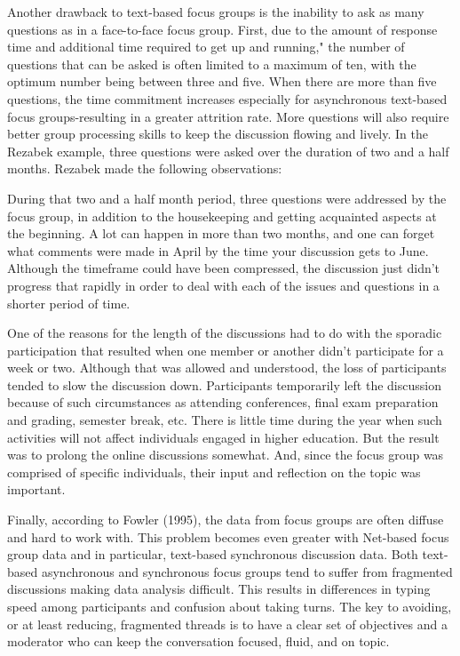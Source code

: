 \documentclass[a4]{article}
\begin{document}
Another drawback to text-based focus groups is the inability to ask as many questions as in a face-to-face focus group. First, due to the amount of response time and additional time required to get up and running," the number of questions that can be asked is often limited to a maximum of ten, with the optimum number being between three and five. When there are more than five questions, the time commitment increases especially for asynchronous text-based focus groups-resulting in a greater attrition rate. More questions will also require better group processing skills to keep the discussion flowing and lively. In the Rezabek example, three questions were asked over the duration of two and a half months. Rezabek made the following observations:


	During that two and a half month period, three questions were addressed by the focus group, in addition to the housekeeping and getting acquainted aspects at the beginning. A lot can happen in more than two months, and one can forget what comments were made in April by the time your discussion gets to June. Although the timeframe could have been compressed, the discussion just didn't progress that rapidly in order to deal with each of the issues and questions in a shorter period of time.
	
	One of the reasons for the length of the discussions had to do with the sporadic participation that resulted when one member or another didn't participate for a week or two. Although that was allowed and understood, the loss of participants tended to slow the discussion down. Participants temporarily left the discussion because of such circumstances as attending conferences, final exam preparation and grading, semester break, etc. There is little time during the year when such activities will not affect individuals engaged in higher education. But the result was to prolong the online discussions somewhat. And, since the focus group was comprised of specific individuals, their input and reflection on the topic was important.


Finally, according to Fowler (1995), the data from focus groups are often diffuse and hard to work with. This problem becomes even greater with Net-based focus group data and in particular, text-based synchronous discussion data. Both text-based asynchronous and synchronous focus groups tend to suffer from fragmented discussions making data analysis difficult. This results in differences in typing speed among participants and confusion about taking turns. The key to avoiding, or at least reducing, fragmented threads is to have a clear set of objectives and a moderator who can keep the conversation focused, fluid, and on topic.
\end{document}
